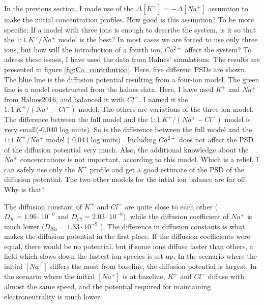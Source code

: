 \documentclass{article}
\begin{document}
In the previous section, I made use of the $\Delta [K^+] = - \Delta [Na^+] $  assumtion to make the initial concentration profiles. How good is this assumtion? To be more specific: If a model with three ions is enough to describe the system, is it so that the $1\!:\!1\ K^+\!/Na^+$ model is the best? In most cases we are forced to use only three ions, but how will the introduction of a fourth ion, $Ca^{2+}$ affect the system? To adress these issues, I have used the data from Halnes' simulations. The results are presented in figure \ref{fig:Ca_contribution}. Here, five different PSDs are shown. The blue line is the diffusion potential resulting from a four-ion model. The green line is a model constructed from the halnes data. Here, I have used $K^+$ and $Na^+$ from Halnes2016, and balanced it with $Cl^-$. I named it the $1\!:\!1\ K^+\!/(Na^+-Cl^-)$ model. The others are variations of the three-ion model. 
The difference between the full model and the $1\!:\!1\ K^+\!/(Na^+-Cl^-)$ model is very small(-0.040 log units). So is the difference between the full model and the $1\!:\!1\ K^+\!/Na^+$  model ( 0.044 log units) . Including $Ca^{2+}$ does not affect the PSD of the diffusion potential very much. Also, the additional knowledge about the $Na^+$ concentrations is not important, according to this model. Which is a relief, I can safely use only the $K^+$ profile and get a good estimate of the PSD of the diffusion potential. The two other models for the intial ion balance are far off. Why is that?


 The diffusion constant of $K^+$ and $Cl^-$ are quite close to each other ($D_K = 1.96\cdot 10^{-9}$ and $D_{Cl} = 2.03\cdot 10^{-9}$), while the diffusion coefficient of $Na^+$ is much lower ($D_{Na} = 1.33\cdot 10^{-9}$ ). The difference in diffusion constants is what makes the diffusion potential in the first place. If the diffusion coefficients were equal, there would be no potential, but if some ions diffuse faster than others, a field which slows down the fastest ion species is set up. In the scenario where the initial $[Na^+]$ differs the most from baseline, the diffusion potential is largest. In the scenario where the initial $[Na^+]$ is at baseline, $K^+$ and $Cl^-$ diffuse with almost the same speed, and the potential required for maintaining electroneutrality is much lower. 
\end{document}
